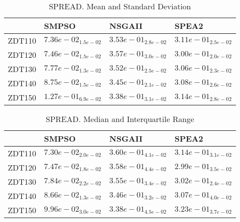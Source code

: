 \documentclass{article}
\begin{document}
\begin{table}
\caption{SPREAD. Mean and Standard Deviation}
\label{table: SPREAD}
\centering
\begin{scriptsize}
\begin{tabular}{llll}
\hline & SMPSO & NSGAII &  SPEA2\\
\hline 
ZDT110 & \cellcolor{gray95}$  7.36e-02_{ 1.5e-02}$ & $  3.53e-01_{ 2.8e-02}$ & \cellcolor{gray25}$  3.11e-01_{ 2.5e-02}$ \\
ZDT120 & \cellcolor{gray95}$  7.46e-02_{ 1.5e-02}$ & $  3.57e-01_{ 3.0e-02}$ & \cellcolor{gray25}$  3.00e-01_{ 2.0e-02}$ \\
ZDT130 & \cellcolor{gray95}$  7.77e-02_{ 1.3e-02}$ & $  3.52e-01_{ 2.5e-02}$ & \cellcolor{gray25}$  3.06e-01_{ 2.3e-02}$ \\
ZDT140 & \cellcolor{gray95}$  8.75e-02_{ 1.5e-02}$ & $  3.45e-01_{ 2.1e-02}$ & \cellcolor{gray25}$  3.08e-01_{ 2.6e-02}$ \\
ZDT150 & \cellcolor{gray95}$  1.27e-01_{ 6.9e-02}$ & $  3.38e-01_{ 3.1e-02}$ & \cellcolor{gray25}$  3.14e-01_{ 2.8e-02}$ \\
\hline
\end{tabular}
\end{scriptsize}
\end{table}

\begin{table}
\caption{SPREAD. Median and Interquartile Range}
\label{table: SPREAD}
\centering
\begin{scriptsize}
\begin{tabular}{llll}
\hline & SMPSO & NSGAII &  SPEA2\\
\hline 
ZDT110 & \cellcolor{gray95}$  7.30e-02_{ 2.0e-02}$ & $  3.60e-01_{ 4.1e-02}$ & \cellcolor{gray25}$  3.14e-01_{ 3.1e-02}$ \\
ZDT120 & \cellcolor{gray95}$  7.47e-02_{ 1.8e-02}$ & $  3.58e-01_{ 4.4e-02}$ & \cellcolor{gray25}$  2.99e-01_{ 3.5e-02}$ \\
ZDT130 & \cellcolor{gray95}$  7.84e-02_{ 2.2e-02}$ & $  3.55e-01_{ 3.4e-02}$ & \cellcolor{gray25}$  3.02e-01_{ 2.4e-02}$ \\
ZDT140 & \cellcolor{gray95}$  8.66e-02_{ 1.3e-02}$ & $  3.46e-01_{ 3.2e-02}$ & \cellcolor{gray25}$  3.07e-01_{ 4.0e-02}$ \\
ZDT150 & \cellcolor{gray95}$  9.96e-02_{ 3.0e-02}$ & $  3.38e-01_{ 4.5e-02}$ & \cellcolor{gray25}$  3.23e-01_{ 3.7e-02}$ \\
\hline
\end{tabular}
\end{scriptsize}
\end{table}
\end{document}
